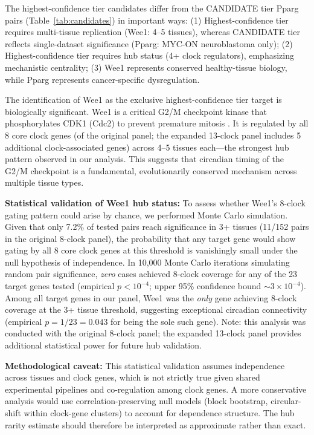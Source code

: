 \documentclass[11pt,a4paper]{article}
\begin{document}
The highest-confidence tier candidates differ from the CANDIDATE tier Pparg pairs (Table~\ref{tab:candidates}) in important ways: (1) Highest-confidence tier requires multi-tissue replication (Wee1: 4--5 tissues), whereas CANDIDATE tier reflects single-dataset significance (Pparg: MYC-ON neuroblastoma only); (2) Highest-confidence tier requires hub status (4+ clock regulators), emphasizing mechanistic centrality; (3) Wee1 represents conserved healthy-tissue biology, while Pparg represents cancer-specific dysregulation.

The identification of Wee1 as the exclusive highest-confidence tier target is biologically significant. Wee1 is a critical G2/M checkpoint kinase that phosphorylates CDK1 (Cdc2) to prevent premature mitosis \citep{mcgowan1993cell, watanabe1995regulation}. It is regulated by all 8 core clock genes (of the original panel; the expanded 13-clock panel includes 5 additional clock-associated genes) across 4--5 tissues each---the strongest hub pattern observed in our analysis. This suggests that circadian timing of the G2/M checkpoint is a fundamental, evolutionarily conserved mechanism across multiple tissue types.

\textbf{Statistical validation of Wee1 hub status:} To assess whether Wee1's 8-clock gating pattern could arise by chance, we performed Monte Carlo simulation. Given that only 7.2\% of tested pairs reach significance in 3+ tissues (11/152 pairs in the original 8-clock panel), the probability that any target gene would show gating by all 8 core clock genes at this threshold is vanishingly small under the null hypothesis of independence. In 10,000 Monte Carlo iterations simulating random pair significance, \textit{zero} cases achieved 8-clock coverage for any of the 23 target genes tested (empirical $p < 10^{-4}$; upper 95\% confidence bound $\sim 3 \times 10^{-4}$). Among all target genes in our panel, Wee1 was the \textit{only} gene achieving 8-clock coverage at the 3+ tissue threshold, suggesting exceptional circadian connectivity (empirical $p = 1/23 = 0.043$ for being the sole such gene). Note: this analysis was conducted with the original 8-clock panel; the expanded 13-clock panel provides additional statistical power for future hub validation.

\textbf{Methodological caveat:} This statistical validation assumes independence across tissues and clock genes, which is not strictly true given shared experimental pipelines and co-regulation among clock genes. A more conservative analysis would use correlation-preserving null models (block bootstrap, circular-shift within clock-gene clusters) to account for dependence structure. The hub rarity estimate should therefore be interpreted as approximate rather than exact.
\end{document}
